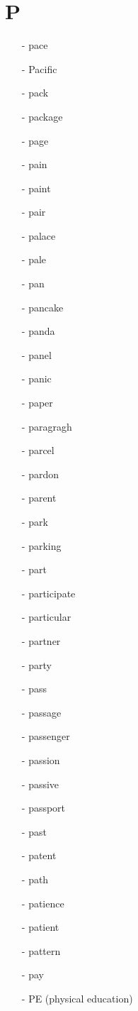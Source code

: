 \documentclass[../../book.tex]{subfiles}
\begin{document}
\section{P}
\raggedcolumns
\begin{multicols}{2}
\begin{itemize}
\item[-] pace
\item[-] Pacific
\item[-] pack
\item[-] package
\item[-] page
\item[-] pain
\item[-] paint
\item[-] pair
\item[-] palace
\item[-] pale
\item[-] pan
\item[-] pancake
\item[-] panda
\item[-] panel
\item[-] panic
\item[-] paper
\item[-] paragragh
\item[-] parcel
\item[-] pardon
\item[-] parent
\item[-] park
\item[-] parking
\item[-] part
\item[-] participate
\item[-] particular
\item[-] partner
\item[-] party
\item[-] pass
\item[-] passage
\item[-] passenger
\item[-] passion
\item[-] passive
\item[-] passport
\item[-] past
\item[-] patent
\item[-] path
\item[-] patience
\item[-] patient
\item[-] pattern
\item[-] pay
\item[-] PE (physical education)

\end{itemize}
\end{multicols}
\end{document}
